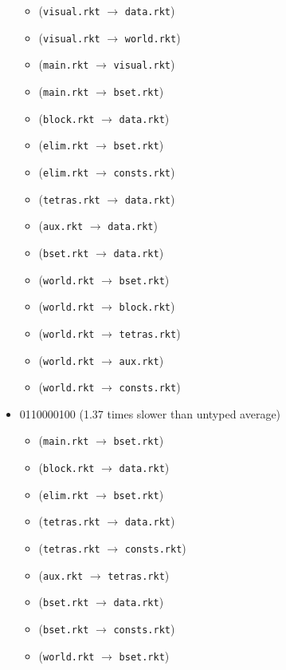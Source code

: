 \documentclass{article}
\newcommand{\mono}[1]{\texttt{#1}}
\begin{document}
\begin{itemize}
  \begin{itemize}
  \item (\mono{visual.rkt} $\rightarrow$ \mono{data.rkt})
  \item (\mono{visual.rkt} $\rightarrow$ \mono{world.rkt})
  \item (\mono{main.rkt} $\rightarrow$ \mono{visual.rkt})
  \item (\mono{main.rkt} $\rightarrow$ \mono{bset.rkt})
  \item (\mono{block.rkt} $\rightarrow$ \mono{data.rkt})
  \item (\mono{elim.rkt} $\rightarrow$ \mono{bset.rkt})
  \item (\mono{elim.rkt} $\rightarrow$ \mono{consts.rkt})
  \item (\mono{tetras.rkt} $\rightarrow$ \mono{data.rkt})
  \item (\mono{aux.rkt} $\rightarrow$ \mono{data.rkt})
  \item (\mono{bset.rkt} $\rightarrow$ \mono{data.rkt})
  \item (\mono{world.rkt} $\rightarrow$ \mono{bset.rkt})
  \item (\mono{world.rkt} $\rightarrow$ \mono{block.rkt})
  \item (\mono{world.rkt} $\rightarrow$ \mono{tetras.rkt})
  \item (\mono{world.rkt} $\rightarrow$ \mono{aux.rkt})
  \item (\mono{world.rkt} $\rightarrow$ \mono{consts.rkt})
  \end{itemize}
\item 0110000100 (1.37 times slower than untyped average)
  \begin{itemize}
  \item (\mono{main.rkt} $\rightarrow$ \mono{bset.rkt})
  \item (\mono{block.rkt} $\rightarrow$ \mono{data.rkt})
  \item (\mono{elim.rkt} $\rightarrow$ \mono{bset.rkt})
  \item (\mono{tetras.rkt} $\rightarrow$ \mono{data.rkt})
  \item (\mono{tetras.rkt} $\rightarrow$ \mono{consts.rkt})
  \item (\mono{aux.rkt} $\rightarrow$ \mono{tetras.rkt})
  \item (\mono{bset.rkt} $\rightarrow$ \mono{data.rkt})
  \item (\mono{bset.rkt} $\rightarrow$ \mono{consts.rkt})
  \item (\mono{world.rkt} $\rightarrow$ \mono{bset.rkt})

\end{itemize}
\end{itemize}
\end{document}
